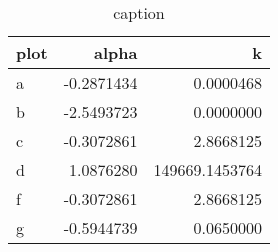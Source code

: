 \begin{table}[ht]
\centering
\begin{tabular}{lrr}
  \hline
plot & alpha & k \\ 
  \hline
a & -0.2871434 & 0.0000468 \\ 
  b & -2.5493723 & 0.0000000 \\ 
  c & -0.3072861 & 2.8668125 \\ 
  d & 1.0876280 & 149669.1453764 \\ 
  f & -0.3072861 & 2.8668125 \\ 
  g & -0.5944739 & 0.0650000 \\ 
   \hline
\end{tabular}
\caption{caption} 
\label{tables/fitting_insideLambda_firstModel_phi1_nm400_dynamic_randomBipartite_allowUnlinked}
\end{table}
